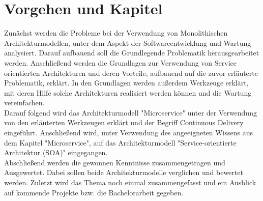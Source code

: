 \section{Vorgehen und Kapitel}
\label{sec:vorgehen}
Zunächst werden die Probleme bei der Verwendung von Monolithischen Architekturmodellen, unter dem Aspekt der Softwareentwicklung und Wartung analysiert. Darauf aufbauend soll die Grundlegende Problematik herausgearbeitet werden. Anschließend werden die Grundlagen zur Verwendung von Service orientierten Architekturen und deren Vorteile, aufbauend auf die zuvor erläuterte Problematik, erklärt. In den Grundlagen werden außerdem Werkzeuge erklärt, mit deren Hilfe solche Architekturen realisiert werden können und die Wartung vereinfachen.
\\
Darauf folgend wird das Architekturmodell "Microservice" unter der Verwendung von den erläuterten Werkzeugen erklärt und der Begriff Continuous Delivery eingeführt. Anschließend wird, unter Verwendung des angeeigneten Wissens aus dem Kapitel "Microservice", auf das Architekturmodell "Service-orientierte Architektur (SOA)" eingegangen.
\\
Abschließend werden die gewonnen Kenntnisse zusammengetragen und Ausgewertet. Dabei sollen beide Architekturmodelle verglichen und bewertet werden. Zuletzt wird das Thema noch einmal zusammengefasst und ein Ausblick auf kommende Projekte bzw. die Bachelorarbeit gegeben.